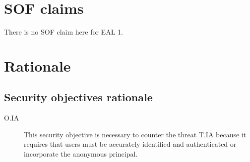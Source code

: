 \documentclass[10pt,a4paper,english]{article}
\begin{document}

\hypertarget{sof-claims}{}
\section*{SOF claims}

There is no SOF claim here for EAL 1.



\hypertarget{rationale}{}
\section*{Rationale}



\hypertarget{security-objectives-rationale}{}
\subsection*{Security objectives rationale}
\begin{description}
\item[O.IA]

This security objective is necessary to counter the threat T.IA
because it requires that users must be accurately identified and
authenticated or incorporate the anonymous principal.

\end{description}
\end{document}
